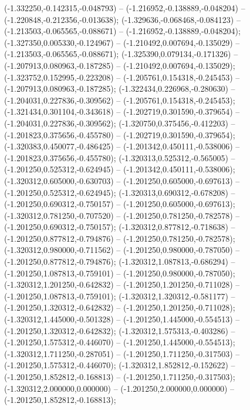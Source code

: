  (-1.332250,-0.142315,-0.048793) -- (-1.216952,-0.138889,-0.048204) -- (-1.220848,-0.212356,-0.013638);
 (-1.329636,-0.068468,-0.084123) -- (-1.213503,-0.065565,-0.088671) -- (-1.216952,-0.138889,-0.048204);
 (-1.327350,0.005330,-0.124967) -- (-1.210492,0.007694,-0.135029) -- (-1.213503,-0.065565,-0.088671);
 (-1.325390,0.079134,-0.171326) -- (-1.207913,0.080963,-0.187285) -- (-1.210492,0.007694,-0.135029);
 (-1.323752,0.152995,-0.223208) -- (-1.205761,0.154318,-0.245453) -- (-1.207913,0.080963,-0.187285);
 (-1.322434,0.226968,-0.280630) -- (-1.204031,0.227836,-0.309562) -- (-1.205761,0.154318,-0.245453);
 (-1.321434,0.301104,-0.343618) -- (-1.202719,0.301590,-0.379654) -- (-1.204031,0.227836,-0.309562);
 (-1.320750,0.375456,-0.412203) -- (-1.201823,0.375656,-0.455780) -- (-1.202719,0.301590,-0.379654);
 (-1.320383,0.450077,-0.486425) -- (-1.201342,0.450111,-0.538006) -- (-1.201823,0.375656,-0.455780);
 (-1.320313,0.525312,-0.565005) -- (-1.201250,0.525312,-0.624945) -- (-1.201342,0.450111,-0.538006);
 (-1.320312,0.605000,-0.630703) -- (-1.201250,0.605000,-0.697613) -- (-1.201250,0.525312,-0.624945);
 (-1.320313,0.690312,-0.678208) -- (-1.201250,0.690312,-0.750157) -- (-1.201250,0.605000,-0.697613);
 (-1.320312,0.781250,-0.707520) -- (-1.201250,0.781250,-0.782578) -- (-1.201250,0.690312,-0.750157);
 (-1.320312,0.877812,-0.718638) -- (-1.201250,0.877812,-0.794876) -- (-1.201250,0.781250,-0.782578);
 (-1.320312,0.980000,-0.711562) -- (-1.201250,0.980000,-0.787050) -- (-1.201250,0.877812,-0.794876);
 (-1.320312,1.087813,-0.686294) -- (-1.201250,1.087813,-0.759101) -- (-1.201250,0.980000,-0.787050);
 (-1.320312,1.201250,-0.642832) -- (-1.201250,1.201250,-0.711028) -- (-1.201250,1.087813,-0.759101);
 (-1.320312,1.320312,-0.581177) -- (-1.201250,1.320312,-0.642832) -- (-1.201250,1.201250,-0.711028);
 (-1.320312,1.445000,-0.501328) -- (-1.201250,1.445000,-0.554513) -- (-1.201250,1.320312,-0.642832);
 (-1.320312,1.575313,-0.403286) -- (-1.201250,1.575312,-0.446070) -- (-1.201250,1.445000,-0.554513);
 (-1.320312,1.711250,-0.287051) -- (-1.201250,1.711250,-0.317503) -- (-1.201250,1.575312,-0.446070);
 (-1.320312,1.852812,-0.152622) -- (-1.201250,1.852812,-0.168813) -- (-1.201250,1.711250,-0.317503);
 (-1.320312,2.000000,0.000000) -- (-1.201250,2.000000,0.000000) -- (-1.201250,1.852812,-0.168813);
